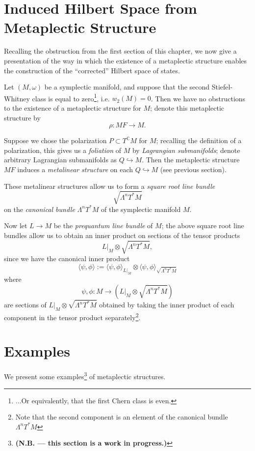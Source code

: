 \documentclass{tufte-handout}
\begin{document}
\section{Induced Hilbert Space from Metaplectic Structure}
Recalling the obstruction from the first section of this chapter, we now give a presentation of the way in which the existence of a metaplectic structure enables the construction of the ``corrected'' Hilbert space of states.

Let $(M,\omega)$ be a symplectic manifold, and suppose that the second Stiefel-Whitney class is equal to zero\footnote{...Or equivalently, that the first Chern class is even.}, i.e. $w_2(M) = 0$. Then we have no obstructions to the existence of a metaplectic structure for $M$; denote this metaplectic structure by
$$
\rho : MF \to M.
$$

Suppose we chose the polarization $P \subset T^{\mathbb{C}}M$ for $M$; recalling the definition of a polarization, this gives us a \emph{foliation} of $M$ by \emph{Lagrangian submanifolds}; denote arbitrary Lagrangian submanifolds as $Q \hookrightarrow M$. Then the metaplectic structure $MF$ induces a \emph{metalinear structure} on each $Q \hookrightarrow M$ (see previous section).

These metalinear structures allow us to form a \emph{square root line bundle}
$$
\sqrt{\Lambda^n T^* M}
$$
on the \emph{canonical bundle} $\Lambda^n T^* M$ of the symplectic manifold $M$.

Now let $L \to M$ be the \emph{prequantum line bundle} of $M$; the above square root line bundles allow us to obtain an inner product on sections of the tensor products
$$
L|_M \otimes \sqrt{\Lambda^n T^* M},
$$
since we have the canonical inner product
$$
\langle \psi, \phi \rangle := \langle \psi, \phi \rangle_{L|_M} \otimes \langle \psi, \phi \rangle_{\sqrt{\Lambda^n T^* M}}
$$
where
$$
\psi, \phi : M \to (L|_M \otimes \sqrt{\Lambda^n T^* M})
$$
are sections of $L|_M \otimes \sqrt{\Lambda^n T^* M}$ obtained by taking the inner product of each component in the tensor product separately\footnote{Note that the second component is an element of the canonical bundle $\Lambda^n T^* M$}.

\section{Examples}
We present some examples\footnote{\textbf{(N.B. --- this section is a work in progress.)}} of metaplectic structures.
\end{document}
